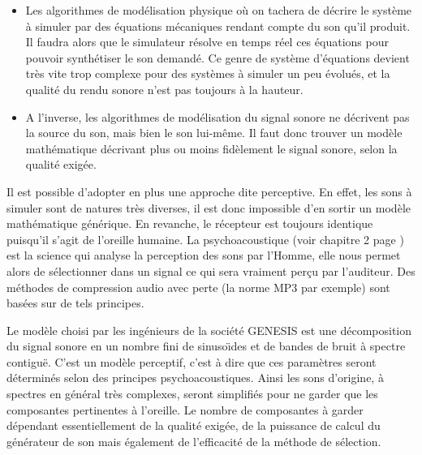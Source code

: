 \begin{itemize}
    \item Les algorithmes de mod{\'e}lisation physique o{\`u} on tachera de
    d{\'e}crire le syst{\`e}me {\`a} simuler par des {\'e}quations m{\'e}caniques
    rendant compte du son qu'il produit. Il faudra alors que le
    simulateur r{\'e}solve en temps r{\'e}el ces {\'e}quations pour pouvoir
    synth{\'e}tiser le son demand{\'e}. Ce genre de syst{\`e}me d'{\'e}quations
    devient tr{\`e}s vite trop complexe pour des syst{\`e}mes {\`a} simuler un
    peu {\'e}volu{\'e}s, et la qualit{\'e} du rendu sonore n'est pas toujours {\`a}
    la hauteur.\\

    \item A l'inverse, les algorithmes de mod{\'e}lisation du signal
    sonore ne d{\'e}crivent pas la source du son, mais bien le son
    lui-m{\^e}me. Il faut donc trouver un mod{\`e}le math{\'e}matique d{\'e}crivant
    plus ou moins fid{\`e}lement le signal sonore, selon la qualit{\'e}
    exig{\'e}e.\\
\end{itemize}

Il est possible d'adopter en plus une approche dite perceptive. En
effet, les sons {\`a} simuler sont de natures tr{\`e}s diverses, il est
donc impossible d'en sortir un mod{\`e}le math{\'e}matique g{\'e}n{\'e}rique. En
revanche, le r{\'e}cepteur est toujours identique puisqu'il s'agit de
l'oreille humaine. La psychoacoustique (voir chapitre 2 page
\pageref{theorie}) est la science qui analyse la perception des
sons par l'Homme, elle nous permet alors de s{\'e}lectionner dans un
signal ce qui sera vraiment per\c{c}u par l'auditeur. Des m{\'e}thodes de
compression audio avec perte (la norme MP3 par exemple) sont
bas{\'e}es sur de tels principes.

Le mod{\`e}le choisi par les ing{\'e}nieurs de la soci{\'e}t{\'e} GENESIS est une
d{\'e}composition du signal sonore en un nombre fini de sinuso{\"\i}des et
de bandes de bruit {\`a} spectre contigu{\"e}. C'est un mod{\`e}le perceptif,
c'est {\`a} dire que ces param{\`e}tres seront d{\'e}termin{\'e}s selon des
principes psychoacoustiques. Ainsi les sons d'origine, {\`a} spectres
en g{\'e}n{\'e}ral tr{\`e}s complexes, seront simplifi{\'e}s pour ne garder que
les composantes pertinentes {\`a} l'oreille. Le nombre de composantes
{\`a} garder d{\'e}pendant essentiellement de la qualit{\'e} exig{\'e}e, de la
puissance de calcul du g{\'e}n{\'e}rateur de son mais {\'e}galement de
l'efficacit{\'e} de la m{\'e}thode de s{\'e}lection.

